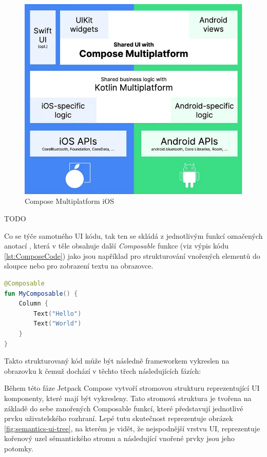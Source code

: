 \begin{figure}[H]
  \centering
  \includegraphics[width=.7\textwidth]{composeIOS.png}
  \caption{Compose Multiplatform iOS}
  \label{fig:composeIOS}
\end{figure}

TODO %

Co se týče samotného UI kódu, tak ten se skládá z jednotlivým funkcí označených anotací , která v těle obsahuje další
\textit{Composable} funkce (viz výpis kódu \ref{lst:ComposeCode}) jako jsou například  pro strukturování vnořených elementů do sloupce nebo  pro zobrazení
textu na obrazovce. 

\begin{lstlisting}[caption={Popis UI widgetů pomocí jazyka Kotlin}, label={lst:ComposeCode}, language=Kotlin]
@Composable
fun MyComposable() {
    Column {
        Text("Hello")
        Text("World")
    }
}
\end{lstlisting}

Takto strukturovaný kód může být následně frameworkem vykreslen na obrazovku k čemuž dochází v těchto třech následujících fázích:

Během této fáze Jetpack Compose vytvoří stromovou strukturu reprezentující UI komponenty, které mají být vykresleny.\cite{jetpackPhases} 
Tato stromová struktura je tvořena na základě do sebe zanořených Composable funkcí, které představují jednotlivé prvku uživatelského rozhraní.
Lepé tutu skutečnost reprezentuje obrázek \ref{fig:semantics-ui-tree}, na kterém je vidět, že nejspodnější vrstvu UI, reprezentuje kořenový uzel
sémantického stromu a následující vnořené prvky jsou jeho potomky.

